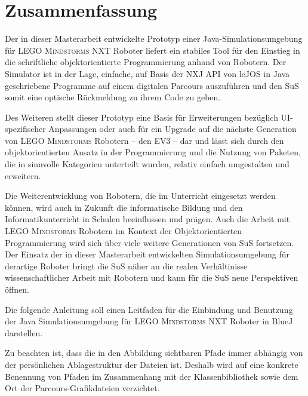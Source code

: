 \documentclass[paper=a4, DIV=calc, BCOR=12mm, twoside=on, onecolumn=on, open = right, titlepage =on, parskip =half-, headsepline = on, footsepline = off, chapterprefix = off, appendixprefix = on, fontsize = 12pt, numbers = noenddot, abstract = on]{scrbook}
\begin{document}
\section{Zusammenfassung}

Der in dieser Masterarbeit entwickelte Prototyp einer Java-Simulations\-um\-ge\-bung für \textsc{LEGO Mindstorms} NXT Roboter liefert ein stabiles Tool für den Einstieg in die schriftliche objektorientierte Programmierung anhand von Robotern. Der Simulator ist in der Lage, einfache, auf Basis der NXJ API von leJOS in Java geschriebene Programme auf einem digitalen Parcours auszuführen und den SuS somit eine optische Rückmeldung zu ihrem Code zu geben.

Des Weiteren stellt dieser Prototyp eine Basis für Erweiterungen bezüglich UI-spezifischer Anpassungen oder auch für ein Upgrade auf die nächste Generation von \textsc{LEGO Mindstorms} Robotern -- den EV3 -- dar und lässt sich durch den objektorientierten Ansatz in der Programmierung und die Nutzung von Paketen, die in sinnvolle Kategorien unterteilt wurden, relativ einfach umgestalten und erweitern.

Die Weiterentwicklung von Robotern, die im Unterricht eingesetzt werden können, wird auch in Zukunft die informatische Bildung und den Informatikunterricht in Schulen beeinflussen und prägen. Auch die Arbeit mit \textsc{LEGO Mindstorms} Robotern im Kontext der Objektorientierten Programmierung wird sich über viele weitere Generationen von SuS fortsetzen. Der Einsatz der in dieser Masterarbeit entwickelten Simulationsumgebung für derartige Roboter bringt die SuS näher an die realen Verhältinisse wissenschaftlicher Arbeit mit Robotern und kann für die SuS neue Perspektiven öffnen. 

\newpage

\newpage


Die folgende Anleitung soll einen Leitfaden für die Einbindung und Benutzung der Java Simulationsumgebung für \textsc{LEGO Mindstorms} NXT Roboter in BlueJ darstellen.

Zu beachten ist, dass die in den Abbildung sichtbaren Pfade immer abhängig von der persönlichen Ablagestruktur der Dateien ist. Deshalb wird auf eine konkrete Benennung von Pfaden im Zusammenhang mit der Klassenbibliothek sowie dem Ort der Parcours-Grafikdateien verzichtet.



\end{document}
